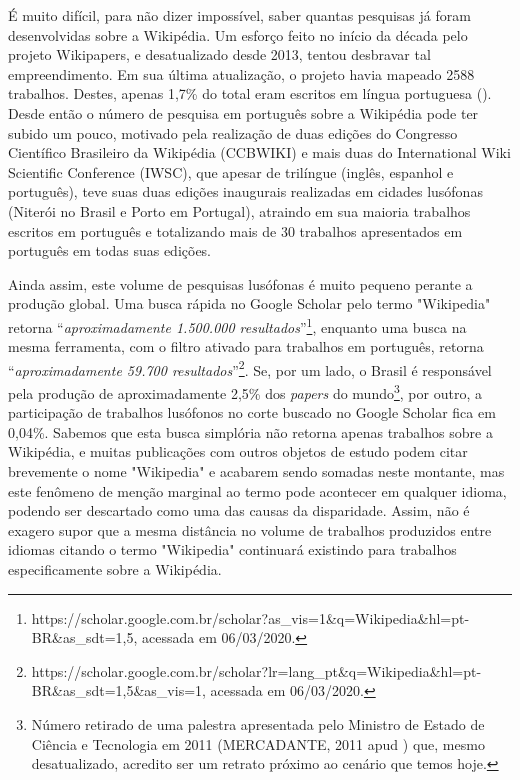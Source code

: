 É muito difícil, para não dizer impossível, saber quantas pesquisas já foram desenvolvidas sobre a Wikipédia. Um esforço feito no início da década pelo projeto Wikipapers, e desatualizado desde 2013, tentou desbravar tal empreendimento. Em sua última atualização, o projeto havia mapeado 2588 trabalhos. Destes, apenas 1,7\% do total eram escritos em língua portuguesa (\cite[68]{esteves_as_2014}). Desde então o número de pesquisa em português sobre a Wikipédia pode ter subido um pouco, motivado pela realização de duas edições do Congresso Científico Brasileiro da Wikipédia (CCBWIKI) e mais duas do International Wiki Scientific Conference (IWSC), que apesar de trilíngue (inglês, espanhol e português), teve suas duas edições inaugurais realizadas em cidades lusófonas (Niterói no Brasil e Porto em Portugal), atraindo em sua maioria trabalhos escritos em português e totalizando mais de 30 trabalhos apresentados em português em todas suas edições.

Ainda assim, este volume de pesquisas lusófonas é muito pequeno perante a produção global. Uma busca rápida no Google Scholar pelo termo "Wikipedia" retorna ``\textit{aproximadamente 1.500.000 resultados}''\footnote{https://scholar.google.com.br/scholar?as\_vis=1\&q=Wikipedia\&hl=pt-BR\&as\_sdt=1,5, acessada em 06/03/2020.}, enquanto uma busca na mesma ferramenta, com o filtro ativado para trabalhos em português, retorna ``\textit{aproximadamente 59.700 resultados}''\footnote{https://scholar.google.com.br/scholar?lr=lang\_pt\&q=Wikipedia\&hl=pt-BR\&as\_sdt=1,5\&as\_vis=1, acessada em 06/03/2020.}. Se, por um lado, o Brasil é responsável pela produção de aproximadamente 2,5\% dos \textit{papers} do mundo\footnote{Número retirado de uma palestra apresentada pelo Ministro de Estado de Ciência e Tecnologia em 2011 (MERCADANTE, 2011 apud \cite{cukierman_uma_2011}) que, mesmo desatualizado, acredito ser um retrato próximo ao cenário que temos hoje.}, por outro, a participação de trabalhos lusófonos no corte buscado no Google Scholar fica em 0,04\%. Sabemos que esta busca simplória não retorna apenas trabalhos sobre a Wikipédia, e muitas publicações com outros objetos de estudo podem citar brevemente o nome "Wikipedia" e acabarem sendo somadas neste montante, mas este fenômeno de menção marginal ao termo pode acontecer em qualquer idioma, podendo ser descartado como uma das causas da disparidade. Assim, não é exagero supor que a mesma distância no volume de trabalhos produzidos entre idiomas citando o termo "Wikipedia" continuará existindo para trabalhos especificamente sobre a Wikipédia. 

